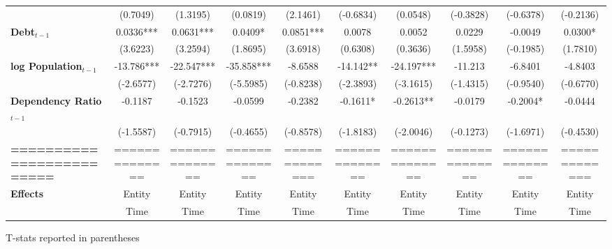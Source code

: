 \begin{center}
\begin{tabular}{lccccccccc}
\textbf{ }                         &    (0.7049)    &     (1.3195)     &     (0.0819)     &     (2.1461)     &    (-0.6834)     &     (0.0548)     &    (-0.3828)     &    (-0.6378)     &    (-0.2136)      \\
\textbf{Debt$_{t-1}$}                &   0.0336***    &    0.0631***     &     0.0409*      &    0.0851***     &      0.0078      &      0.0052      &      0.0229      &     -0.0049      &     0.0300*       \\
\textbf{ }                         &    (3.6223)    &     (3.2594)     &     (1.8695)     &     (3.6918)     &     (0.6308)     &     (0.3636)     &     (1.5958)     &    (-0.1985)     &     (1.7810)      \\
\textbf{log Population$_{t-1}$}      &   -13.786***   &    -22.547***    &    -35.858***    &     -8.6588      &    -14.142**     &    -24.197***    &     -11.213      &     -6.8401      &     -4.8403       \\
\textbf{ }                         &   (-2.6577)    &    (-2.7276)     &    (-5.5985)     &    (-0.8238)     &    (-2.3893)     &    (-3.1615)     &    (-1.4315)     &    (-0.9540)     &    (-0.6770)      \\
\textbf{Dependency Ratio$_{t-1}$}   &    -0.1187     &     -0.1523      &     -0.0599      &     -0.2382      &     -0.1611*     &    -0.2613**     &     -0.0179      &     -0.2004*     &     -0.0444       \\
\textbf{ }                         &   (-1.5587)    &    (-0.7915)     &    (-0.4655)     &    (-0.8578)     &    (-1.8183)     &    (-2.0046)     &    (-0.1273)     &    (-1.6971)     &    (-0.4530)      \\
\textbf{=========================} & ============== &  ==============  &  ==============  &  =============   &  ==============  &  ==============  &  ==============  &  ==============  &  =============    \\
\textbf{Effects}                   &     Entity     &      Entity      &      Entity      &      Entity      &      Entity      &      Entity      &      Entity      &      Entity      &      Entity       \\
\textbf{}                          &      Time      &       Time       &       Time       &       Time       &       Time       &       Time       &       Time       &       Time       &       Time        \\
\bottomrule
\end{tabular}
\end{center}

T-stats reported in parentheses